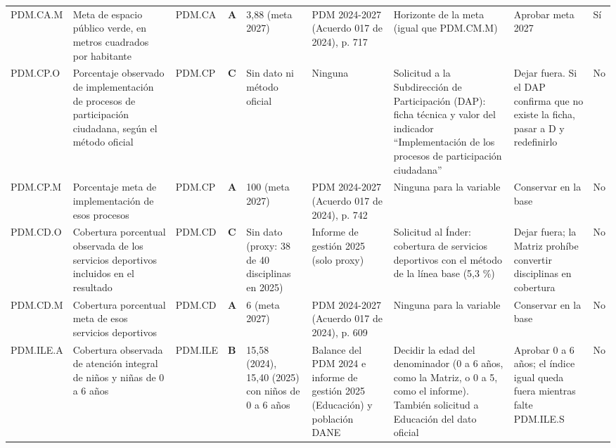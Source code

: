 \documentclass[11pt,letterpaper]{article}
\begin{document}
{\begin{xltabular}{\linewidth}{L{1.94cm}L{2.56cm}L{2.04cm}L{1.12cm}L{2.87cm}L{2.87cm}L{2.71cm}L{2.77cm}L{2.04cm}}
PDM.CA.M & Meta de espacio público verde, en metros cuadrados por habitante & PDM.CA & \textbf{A} & 3,88 (meta 2027) & PDM 2024-2027 (Acuerdo 017 de 2024), p. 717 & Horizonte de la meta (igual que PDM.CM.M) & Aprobar meta 2027 & Sí \\
PDM.CP.O & Porcentaje observado de implementación de procesos de participación ciudadana, según el método oficial & PDM.CP & \textbf{C} & Sin dato ni método oficial & Ninguna & Solicitud a la Subdirección de Participación (DAP): ficha técnica y valor del indicador ``Implementación de los procesos de participación ciudadana'' & Dejar fuera. Si el DAP confirma que no existe la ficha, pasar a D y redefinirlo & No \\
PDM.CP.M & Porcentaje meta de implementación de esos procesos & PDM.CP & \textbf{A} & 100 (meta 2027) & PDM 2024-2027 (Acuerdo 017 de 2024), p. 742 & Ninguna para la variable & Conservar en la base & No \\
PDM.CD.O & Cobertura porcentual observada de los servicios deportivos incluidos en el resultado & PDM.CD & \textbf{C} & Sin dato (proxy: 38 de 40 disciplinas en 2025) & Informe de gestión 2025 (solo proxy) & Solicitud al Índer: cobertura de servicios deportivos con el método de la línea base (5,3 \%) & Dejar fuera; la Matriz prohíbe convertir disciplinas en cobertura & No \\
PDM.CD.M & Cobertura porcentual meta de esos servicios deportivos & PDM.CD & \textbf{A} & 6 (meta 2027) & PDM 2024-2027 (Acuerdo 017 de 2024), p. 609 & Ninguna para la variable & Conservar en la base & No \\
PDM.ILE.A & Cobertura observada de atención integral de niños y niñas de 0 a 6 años & PDM.ILE & \textbf{B} & 15,58 (2024), 15,40 (2025) con niños de 0 a 6 años & Balance del PDM 2024 e informe de gestión 2025 (Educación) y población DANE & Decidir la edad del denominador (0 a 6 años, como la Matriz, o 0 a 5, como el informe). También solicitud a Educación del dato oficial & Aprobar 0 a 6 años; el índice igual queda fuera mientras falte PDM.ILE.S & No \\

\end{xltabular}}
\end{document}
